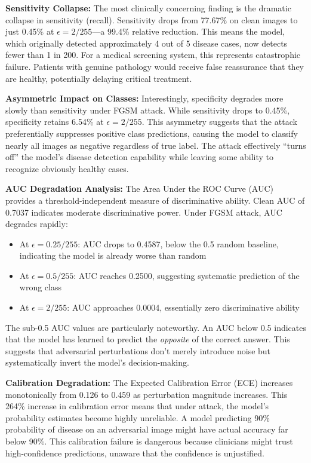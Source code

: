\documentclass[12pt,a4paper]{article}
\begin{document}
\textbf{Sensitivity Collapse:} The most clinically concerning finding is the dramatic collapse in sensitivity (recall). Sensitivity drops from 77.67\% on clean images to just 0.45\% at $\epsilon=2/255$---a 99.4\% relative reduction. This means the model, which originally detected approximately 4 out of 5 disease cases, now detects fewer than 1 in 200. For a medical screening system, this represents catastrophic failure. Patients with genuine pathology would receive false reassurance that they are healthy, potentially delaying critical treatment.

\textbf{Asymmetric Impact on Classes:} Interestingly, specificity degrades more slowly than sensitivity under FGSM attack. While sensitivity drops to 0.45\%, specificity retains 6.54\% at $\epsilon=2/255$. This asymmetry suggests that the attack preferentially suppresses positive class predictions, causing the model to classify nearly all images as negative regardless of true label. The attack effectively ``turns off'' the model's disease detection capability while leaving some ability to recognize obviously healthy cases.

\textbf{AUC Degradation Analysis:} The Area Under the ROC Curve (AUC) provides a threshold-independent measure of discriminative ability. Clean AUC of 0.7037 indicates moderate discriminative power. Under FGSM attack, AUC degrades rapidly:
\begin{itemize}[leftmargin=*]
    \item At $\epsilon=0.25/255$: AUC drops to 0.4587, below the 0.5 random baseline, indicating the model is already worse than random
    \item At $\epsilon=0.5/255$: AUC reaches 0.2500, suggesting systematic prediction of the wrong class
    \item At $\epsilon=2/255$: AUC approaches 0.0004, essentially zero discriminative ability
\end{itemize}

The sub-0.5 AUC values are particularly noteworthy. An AUC below 0.5 indicates that the model has learned to predict the \textit{opposite} of the correct answer. This suggests that adversarial perturbations don't merely introduce noise but systematically invert the model's decision-making.

\textbf{Calibration Degradation:} The Expected Calibration Error (ECE) increases monotonically from 0.126 to 0.459 as perturbation magnitude increases. This 264\% increase in calibration error means that under attack, the model's probability estimates become highly unreliable. A model predicting 90\% probability of disease on an adversarial image might have actual accuracy far below 90\%. This calibration failure is dangerous because clinicians might trust high-confidence predictions, unaware that the confidence is unjustified.
\end{document}
